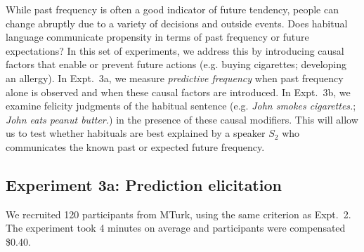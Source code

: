 \documentclass[10pt,letterpaper]{article}
\newcommand{\ndg}[1]{\textcolor{Green}{[ndg: #1]}}
\begin{document}

While past frequency is often a good indicator of future tendency, people can change abruptly due to a variety of decisions and outside events.
Does habitual language communicate propensity in terms of past frequency or future expectations?
In this set of experiments, we address this by introducing causal factors that enable or prevent future actions (e.g. buying cigarettes; developing an allergy).
In Expt.~3a, we measure \emph{predictive frequency} when past frequency alone is observed and when these causal factors are introduced.
In Expt.~3b, we examine felicity judgments of the habitual sentence (e.g. \emph{John smokes cigarettes.}; \emph{John eats peanut butter.}) in the presence of these causal modifiers.
This will allow us to test whether habituals are best explained by a speaker $S_2$ who communicates the known past or expected future frequency.

\subsection{Experiment 3a: Prediction elicitation}


We recruited 120 participants from MTurk, using the same criterion as Expt.~2.
The experiment took 4 minutes on average and participants were compensated \$0.40.
\end{document}

